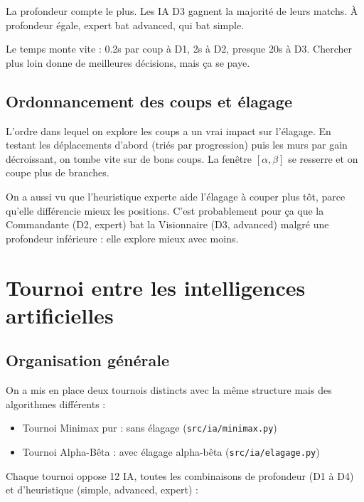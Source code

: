 \documentclass[a4paper, 12pt]{report}
\begin{document}
La profondeur compte le plus. Les IA D3 gagnent la majorité de leurs matchs. À profondeur égale, expert bat advanced, qui bat simple.

Le temps monte vite : 0.2s par coup à D1, 2s à D2, presque 20s à D3. Chercher plus loin donne de meilleures décisions, mais ça se paye.

\subsection{Ordonnancement des coups et élagage}

L'ordre dans lequel on explore les coups a un vrai impact sur l'élagage. En testant les déplacements d'abord (triés par progression) puis les murs par gain décroissant, on tombe vite sur de bons coups. La fenêtre $[\alpha, \beta]$ se resserre et on coupe plus de branches.

On a aussi vu que l'heuristique experte aide l'élagage à couper plus tôt, parce qu'elle différencie mieux les positions. C'est probablement pour ça que la Commandante (D2, expert) bat la Visionnaire (D3, advanced) malgré une profondeur inférieure : elle explore mieux avec moins.

\section{Tournoi entre les intelligences artificielles}

\subsection{Organisation générale}

On a mis en place deux tournois distincts avec la même structure mais des algorithmes différents :
\begin{itemize}
    \item Tournoi Minimax pur : sans élagage (\texttt{src/ia/minimax.py})
    \item Tournoi Alpha-Bêta : avec élagage alpha-bêta (\texttt{src/ia/elagage.py})
\end{itemize}

Chaque tournoi oppose 12 IA, toutes les combinaisons de profondeur (D1 à D4) et d'heuristique (simple, advanced, expert) :
\end{document}
